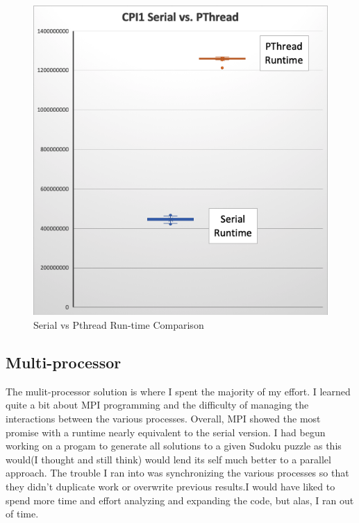 \documentclass[11pt, a4paper]{article} %
\begin{document}
\begin{figure}
  \includegraphics[width=\linewidth]{SerialvsPThread.png}
  \caption{Serial vs Pthread Run-time Comparison}
  \label{fig:SerialvPthread}
\end{figure}


\subsection{Multi-processor}
The mulit-processor solution is where I spent the majority of my effort.  I learned quite a bit about MPI programming and the difficulty of managing the interactions between the various processes. Overall, MPI showed the most promise with a runtime nearly equivalent to the serial version. I had begun working on a progam to generate all solutions to a given Sudoku puzzle as this would(I thought and still think) would lend its self much better to a parallel approach.  The trouble I ran into was synchronizing the various processes so that they didn't duplicate work or overwrite previous results.I would have liked to spend more time and effort analyzing and expanding the code, but alas, I ran out of time.
\end{document}
